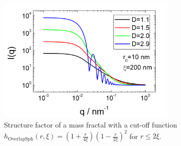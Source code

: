 \begin{figure}[htb]
\begin{center}
\includegraphics[width=0.768\textwidth]{../images/structure_factor/MassFractals/SQOverlapSphCutOff.png}
\end{center}
\caption{Structure factor of a mass fractal with a
cut-off function $h_\text{OverlapSph}(r,\xi) = \left(1+\frac{r}{4\xi}\right)\left(1-\frac{r}{2\xi}\right)^2$ for $r\leq 2\xi$.}
\label{fig:SQOverlappSphCutOff}
\end{figure}
